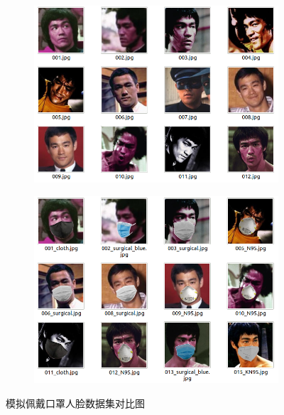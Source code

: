 \begin{figure}[H]
    \centering
    \begin{subfigure}{.45\textwidth}
        \centering
        \includegraphics[width=\textwidth]{figures/4webface.png}
    \end{subfigure}
    \qquad
    \begin{subfigure}{.45\textwidth}
        \centering
        \includegraphics[width=\textwidth]{figures/5webmaskedface.png}
    \end{subfigure}
    \caption{模拟佩戴口罩人脸数据集对比图}
    \label{fig:cmrsds}
\end{figure}

